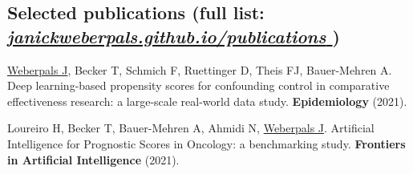 \documentclass[letterpaper]{twentysecondcv} %
\begin{document}


\subsection{Selected publications \small(full list: \href{https://janickweberpals.github.io/publications}{\textit{janickweberpals.github.io/publications \ExternalLink}})}


\underline{Weberpals J}, Becker T, Schmich F, Ruettinger D, Theis FJ, Bauer-Mehren A. Deep learning-based propensity scores for confounding control in comparative effectiveness research: a large-scale real-world data study. \textbf{Epidemiology} (2021).%

Loureiro H, Becker T, Bauer-Mehren A, Ahmidi N, \underline{Weberpals J}. Artificial Intelligence for Prognostic Scores in Oncology: a benchmarking study. \textbf{Frontiers in Artificial Intelligence} (2021). %





%
%
\end{document}
